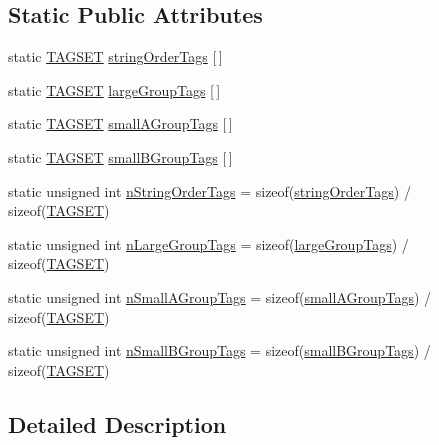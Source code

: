 \subsection*{Static Public Attributes}
\begin{CompactItemize}
\item 
static \hyperlink{structkmaOrange_1_1tagcode}{TAGSET} \hyperlink{classkmaOrange_1_1TagSet_47bb16338b782454284836622d21fa3f}{stringOrderTags} \mbox{[}$\,$\mbox{]}
\item 
static \hyperlink{structkmaOrange_1_1tagcode}{TAGSET} \hyperlink{classkmaOrange_1_1TagSet_6a4cec112f4e44e88eb4f472add2ffbc}{largeGroupTags} \mbox{[}$\,$\mbox{]}
\item 
static \hyperlink{structkmaOrange_1_1tagcode}{TAGSET} \hyperlink{classkmaOrange_1_1TagSet_c74342cb8a38252ea97d0a98d2a8ff45}{smallAGroupTags} \mbox{[}$\,$\mbox{]}
\item 
static \hyperlink{structkmaOrange_1_1tagcode}{TAGSET} \hyperlink{classkmaOrange_1_1TagSet_ce82d1fbb91c0cd836d5792a859d6a35}{smallBGroupTags} \mbox{[}$\,$\mbox{]}
\item 
static unsigned int \hyperlink{classkmaOrange_1_1TagSet_e5c42e1b00247c5fc5e2c17b55079fbc}{nStringOrderTags} = sizeof(\hyperlink{classkmaOrange_1_1TagSet_47bb16338b782454284836622d21fa3f}{stringOrderTags}) / sizeof(\hyperlink{structkmaOrange_1_1tagcode}{TAGSET})
\item 
static unsigned int \hyperlink{classkmaOrange_1_1TagSet_277bde9aabfe64d44592a28639e7dd5b}{nLargeGroupTags} = sizeof(\hyperlink{classkmaOrange_1_1TagSet_6a4cec112f4e44e88eb4f472add2ffbc}{largeGroupTags}) / sizeof(\hyperlink{structkmaOrange_1_1tagcode}{TAGSET})
\item 
static unsigned int \hyperlink{classkmaOrange_1_1TagSet_1b8ca1eea8dfbbf8c12adb1481f3bfd3}{nSmallAGroupTags} = sizeof(\hyperlink{classkmaOrange_1_1TagSet_c74342cb8a38252ea97d0a98d2a8ff45}{smallAGroupTags}) / sizeof(\hyperlink{structkmaOrange_1_1tagcode}{TAGSET})
\item 
static unsigned int \hyperlink{classkmaOrange_1_1TagSet_c90423f53e2c05b9a477bb4c2e8e4f2d}{nSmallBGroupTags} = sizeof(\hyperlink{classkmaOrange_1_1TagSet_ce82d1fbb91c0cd836d5792a859d6a35}{smallBGroupTags}) / sizeof(\hyperlink{structkmaOrange_1_1tagcode}{TAGSET})
\end{CompactItemize}


\subsection{Detailed Description}



